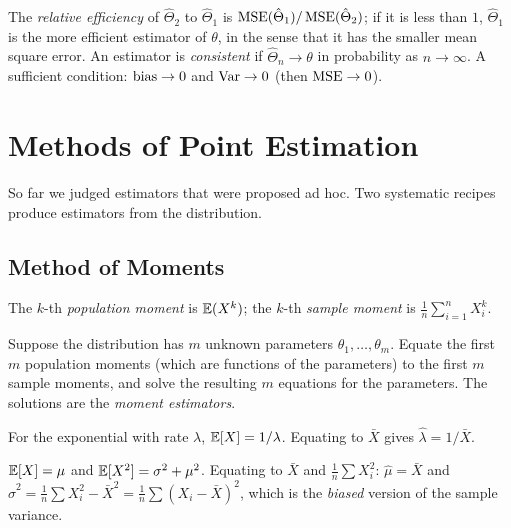 \begin{definition}
The \emph{relative efficiency} of $\hat\Theta_2$ to $\hat\Theta_1$ is $\operatorname{MSE}(\hat\Theta_1)/\operatorname{MSE}(\hat\Theta_2)$; if it is less than $1$, $\hat\Theta_1$ is the more efficient estimator of $\theta$, in the sense that it has the smaller mean square error. An estimator is \emph{consistent} if $\hat\Theta_n\to\theta$ in probability as $n\to\infty$. A sufficient condition: $\operatorname{bias}\to0$ and $\operatorname{Var}\to0$ (then $\operatorname{MSE}\to0$).
\end{definition}

\section{Methods of Point Estimation}

So far we judged estimators that were proposed ad hoc. Two systematic recipes produce estimators from the distribution.

\subsection{Method of Moments}

\begin{definition}
The $k$-th \emph{population moment} is $\mathbb{E}(X^k)$; the $k$-th \emph{sample moment} is $\frac1n\sum_{i=1}^nX_i^k$.
\end{definition}

\begin{definition}
Suppose the distribution has $m$ unknown parameters $\theta_1,\dots,\theta_m$. Equate the first $m$ population moments (which are functions of the parameters) to the first $m$ sample moments, and solve the resulting $m$ equations for the parameters. The solutions are the \emph{moment estimators}.
\end{definition}

\begin{example}[Exponential]\label{ex:momexp}
For the exponential with rate $\lambda$, $\mathbb{E}[X]=1/\lambda$. Equating to $\bar{X}$ gives $\hat\lambda=1/\bar{X}$.
\end{example}

\begin{example}[Normal]
$\mathbb{E}[X]=\mu$ and $\mathbb{E}[X^2]=\sigma^2+\mu^2$. Equating to $\bar{X}$ and $\frac1n\sum X_i^2$: $\hat\mu=\bar{X}$ and $\hat\sigma^2=\frac1n\sum X_i^2-\bar{X}^2=\frac1n\sum(X_i-\bar{X})^2$, which is the \emph{biased} version of the sample variance.
\end{example}

